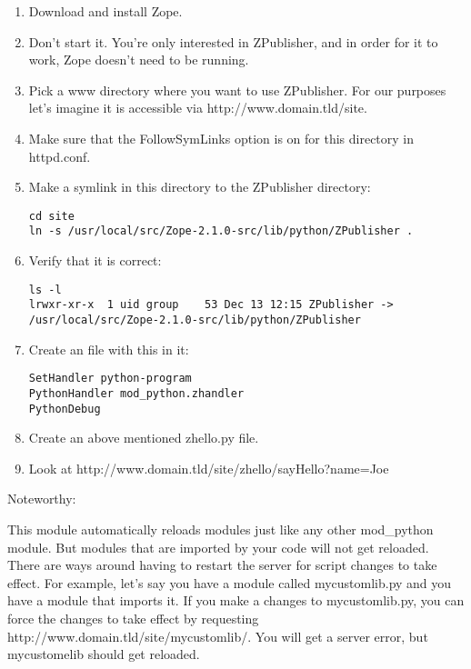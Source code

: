 \begin{enumerate}

\item
Download and install Zope. 

\item
Don't start it. You're only interested in ZPublisher, and in order for
it to work, Zope doesn't need to be running.

\item
Pick a www directory where you want to use ZPublisher. For our purposes
    let's imagine it is accessible via http://www.domain.tld/site. 

\item
Make sure that the FollowSymLinks option is on for this directory 
    in httpd.conf.

\item
Make a symlink in this directory to the ZPublisher directory:
\begin{verbatim}
cd site
ln -s /usr/local/src/Zope-2.1.0-src/lib/python/ZPublisher .
\end{verbatim}

\item
Verify that it is correct:
\begin{verbatim}
ls -l
lrwxr-xr-x  1 uid group    53 Dec 13 12:15 ZPublisher -> /usr/local/src/Zope-2.1.0-src/lib/python/ZPublisher
\end{verbatim}

\item
Create an  file with this in it:

\begin{verbatim}
SetHandler python-program
PythonHandler mod_python.zhandler
PythonDebug
\end{verbatim}

\item
Create an above mentioned zhello.py file.

\item
Look at http://www.domain.tld/site/zhello/sayHello?name=Joe

\end{enumerate}

Noteworthy:
 
This module automatically reloads modules just like any other
mod_python module. But modules that are imported by your code will not
get reloaded.  There are ways around having to restart the server for
script changes to take effect. For example, let's say you have a
module called mycustomlib.py and you have a module that imports it. If
you make a changes to mycustomlib.py, you can force the changes to
take effect by requesting http://www.domain.tld/site/mycustomlib/.
You will get a server error, but mycustomelib should get reloaded.
 
